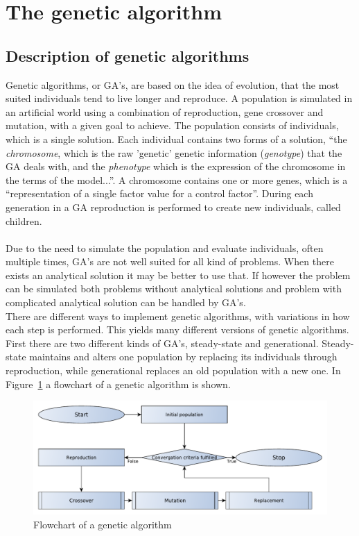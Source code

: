 \section{The genetic algorithm}
\subsection{Description of genetic algorithms}
Genetic algorithms, or GA's, are based on the idea of evolution, that the most suited individuals tend to live longer and reproduce. A population is simulated in an artificial world using a combination of reproduction, gene crossover and mutation, with a given goal to achieve. The population consists of individuals, which is a single solution. Each individual contains two forms of a solution, ``the \textit{chromosome}, which is the raw 'genetic' genetic information (\textit{genotype}) that the GA deals with, and the \textit{phenotype} which is the expression of the chromosome in the terms of the model...''\cite{GAHandbook1}. A chromosome contains one or more genes, which is a ``representation of a single factor value for a control factor''\cite{GAHandbook1}. During each generation in a GA reproduction is performed to create new individuals, called children.\\
\\
Due to the need to simulate the population and evaluate individuals, often multiple times, GA's are not well suited for all kind of problems. When there exists an analytical solution it may be better to use that. %
If however the problem can be simulated both problems without analytical solutions and problem with complicated analytical solution can be handled by GA's.
\\There are different ways to implement genetic algorithms, with variations in how each step is performed. This yields many different versions of genetic algorithms. First there are two different kinds of GA's, steady-state and generational. Steady-state maintains and alters one population by replacing its individuals through reproduction, while generational replaces an old population with a new one.
In Figure~\ref{GeneticFlowChart-generic} a flowchart of a genetic algorithm is shown.
\begin{figure}[t!hb]
	\centering
	\includegraphics[width=\textwidth]{chapter_4_methods/GeneticFlowChart-Generic}
  	\caption[Flowchart of a genetic algorithm]
  	{Flowchart of a genetic algorithm}
	\label{GeneticFlowChart-generic}
\end{figure}
